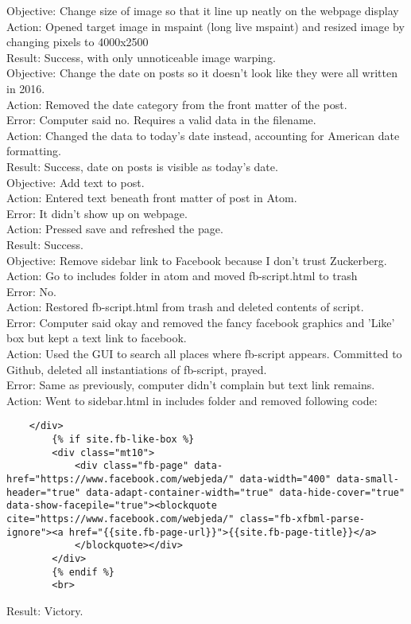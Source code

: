\documentclass{article}
\begin{document}
Objective: Change size of image so that it line up neatly on the webpage display\\
Action: Opened target image in mspaint (long live mspaint) and resized image by changing pixels to 4000x2500\\
Result: Success, with only unnoticeable image warping.\\

Objective: Change the date on posts so it doesn't look like they were all written in 2016.\\ 
Action: Removed the date category from the front matter of the post.\\
Error: Computer said no. Requires a valid data in the filename.\\
Action: Changed the data to today's date instead, accounting for American date formatting.\\
Result: Success, date on posts is visible as today's date.\\

Objective: Add text to post.\\
Action: Entered text beneath front matter of post in Atom.\\
Error: It didn't show up on webpage.\\
Action: Pressed save and refreshed the page.\\
Result: Success.\\

Objective: Remove sidebar link to Facebook because I don't trust Zuckerberg.\\
Action: Go to includes folder in atom and moved fb-script.html to trash\\
Error: No.\\
Action: Restored fb-script.html from trash and deleted contents of script.\\
Error: Computer said okay and removed the fancy facebook graphics and 'Like' box but kept a text link to facebook.\\
Action: Used the GUI to search all places where fb-script appears. Committed to Github, deleted all instantiations of fb-script, prayed.\\
Error: Same as previously, computer didn't complain but text link remains.\\
Action: Went to sidebar.html in includes folder and removed following code: 
\begin{verbatim}
    </div>
        {% if site.fb-like-box %}
        <div class="mt10">
            <div class="fb-page" data-href="https://www.facebook.com/webjeda/" data-width="400" data-small-header="true" data-adapt-container-width="true" data-hide-cover="true" data-show-facepile="true"><blockquote cite="https://www.facebook.com/webjeda/" class="fb-xfbml-parse-ignore"><a href="{{site.fb-page-url}}">{{site.fb-page-title}}</a>
            </blockquote></div>
        </div>
        {% endif %}
        <br>
\end{verbatim}
Result: Victory.\\
\end{document}
